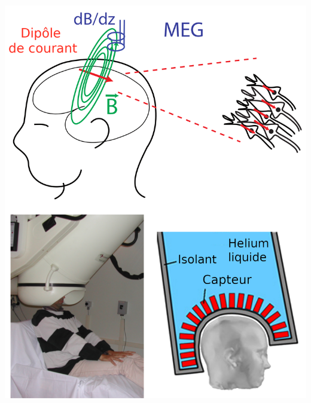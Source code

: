 \documentclass{beamer}
\begin{document}
{\begin{columns}[T]
        \includegraphics[width=\textwidth]{meg_presentation}
    \end{columns}
    \begin{columns}
    \end{columns}

}
\end{document}
